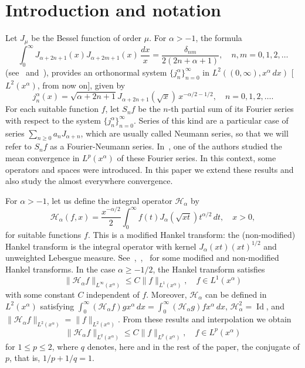 \documentclass[reqno]{amsart}
\theoremstyle{plain}
\theoremstyle{definition}
\theoremstyle{remark}
\newcommand{\lpnorm}[3]{\|{#1}\|_{L^{#2}({#3})}} %
\newcommand{\Id}{\operatorname{Id}} %
\newcommand{\htr}{\mathcal{H}_\alpha} %
\begin{document}
\section{Introduction and notation}

Let $J_\mu$ be the Bessel function of order $\mu$.
For $\alpha>-1$, the formula
\begin{equation*}
   \int_0^\infty J_{\alpha+2n+1}(x) J_{\alpha+2m+1}(x) \, \frac{dx}{x}
   = \frac{\delta_{nm}}{2(2n+\alpha+1)},
   \quad n, m = 0,1,2, \dots
\end{equation*}
(see~\cite[Ch.~XIII, 13.41 (7), p.~404]{Wat} and~\cite[Ch.~XIII, 13.42 (1),
p.~405]{Wat}), provides an orthonormal system $\{j_n^\alpha\}_{n=0}^\infty$ in
$L^2((0,\infty), x^\alpha \, dx)$ [$L^2(x^\alpha)$, from now on], given by
\begin{equation*}
   j_n^\alpha(x)
   = \sqrt{\alpha+2n+1} J_{\alpha+2n+1}(\sqrt x) \, x^{-\alpha/2-1/2},
   \quad n = 0,1,2, \dots.
\end{equation*}
For each suitable function $f$, let $S_nf$ be the
$n$-th partial sum of its Fourier series with respect to the system
$\{j_n^\alpha\}_{n=0}^\infty$. Series of this kind are a particular case of
series $\sum_{n\ge0} a_n J_{\alpha+n}$, which are usually called Neumann
series, so that we will refer to $S_nf$ as a Fourier-Neumann series.
In~\cite{Var}, one of the authors studied the mean convergence in
$L^p(x^\alpha)$ of these Fourier series. In this context, some operators and
spaces were introduced. In this paper we extend these results and also
study the almost everywhere convergence.

For $\alpha > -1$, let us define the integral operator $\htr$ by
\begin{equation*}
    \htr(f,x) = \frac{x^{-\alpha/2}}{2}
     \int_0^\infty {f(t)J_\alpha (\sqrt {xt})t^{\alpha /2}\,dt},
     \quad x > 0,
\end{equation*}
for suitable functions $f$. This is a modified Hankel transform: the
(non-modified) Hankel transform is the integral operator with kernel
$J_\alpha(xt) (xt)^{1/2}$ and unweighted Lebesgue measure.
See~\cite{Dur},~\cite{St-Tr},~\cite{Me-So} for some modified and non-modified
Hankel transforms. In the case $\alpha \ge -1/2$, the Hankel transform
satisfies
\begin{equation*}
    \lpnorm{\htr f}\infty{x^\alpha}
      \le C \lpnorm{f}1{x^\alpha},
      \quad f \in L^1(x^\alpha)
\end{equation*}
with some constant $C$ independent of $f$.
Moreover, $\htr$ can be defined in $L^2(x^\alpha)$ satisfying
$\int_0^\infty (\htr f)g x^\alpha\,dx = \int_0^\infty (\htr g)f x^\alpha\,dx$,
$\htr^2 = \Id$, and $\lpnorm{\htr f}2{x^\alpha} =
\lpnorm{f}2{x^\alpha}$. From these results and interpolation we obtain
\begin{equation*}
    \lpnorm{\htr f}q{x^\alpha}
      \le C \lpnorm{f}p{x^\alpha},
      \quad f \in L^p(x^\alpha)
\end{equation*}
for $1\le p\le2$, where $q$ denotes, here and in the rest of the paper, the
conjugate of $p$, that is, $1/p+1/q=1$.
\end{document}

